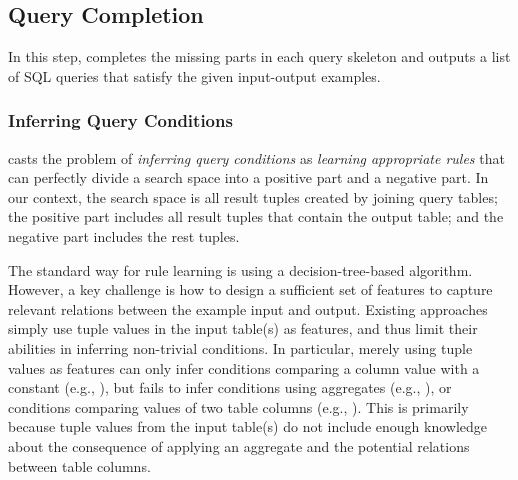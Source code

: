 

\subsection{Query Completion}
\label{sec:completion}

\enlargethispage{5pt}
\vspace{-1mm}

In this step, \ourtool completes the missing parts
in each query skeleton and outputs a list of SQL queries
that satisfy the given input-output examples.




\subsubsection{Inferring Query Conditions}
\label{sec:condition}

\ourtool casts the problem of \textit{inferring query conditions} as
 \textit{learning appropriate rules} that can perfectly divide a search space
into a positive part and a negative part. In our context, the search space
is all result tuples created by joining query tables; the positive part
includes all result tuples that contain the output table; and the negative part includes the rest
tuples.

The standard way for rule learning is using a decision-tree-based
algorithm. However, a key challenge is how
to design a sufficient set of features to capture relevant
relations between the example input and output.
Existing approaches~\cite{Tran:2009} simply use
tuple values in the input table(s) as features, 
and thus limit their abilities in inferring non-trivial
conditions. In particular,
merely using tuple values as features can only infer
conditions comparing a column value with a constant
(e.g., ), but
fails to infer conditions using aggregates (e.g., ),
or conditions comparing values of two table columns
(e.g., ).
This is primarily because tuple values from the input table(s)
do not include enough knowledge about the consequence of
applying an aggregate and the potential relations between
table columns.


